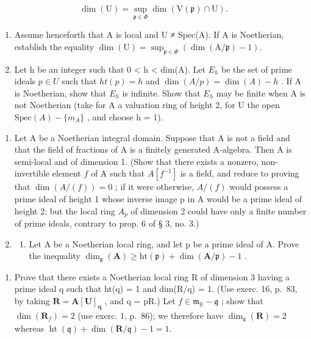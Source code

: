 \[
\dim (\mathrm{U}) = \sup _ {\mathfrak {p} \in \Phi} \dim (\mathrm{V} (\mathfrak {p}) \cap \mathrm{U}).
\]

\begin{enumerate}
\def\labelenumi{\alph{enumi})}
\setcounter{enumi}{3}
\item
  Assume henceforth that A is local and U ≠ Spec(A). If A is Noetherian, establish the equality \(\dim(\mathrm{U}) = \sup_{\mathfrak{p}\in\Phi}(\dim(\mathrm{A}/\mathfrak{p}) - 1)\).
\item
  Let h be an integer such that 0 \textless{} h \textless{} dim(A). Let \(E_{h}\) be the set of prime ideals \(p \in U\) such that \(ht(p) = h\) and \(\dim(A/p) = \dim(A) - h\) . If A is Noetherian, show that \(E_{h}\) is infinite. Show that \(E_{h}\) may be finite when A is not Noetherian (take for A a valuation ring of height 2, for U the open \(\text{Spec}(A) - \{m_{A}\}\) , and choose h = 1).
\end{enumerate}

\begin{enumerate}
\def\labelenumi{\arabic{enumi})}
\setcounter{enumi}{1}
\item
  Let A be a Noetherian integral domain. Suppose that A is not a field and that the field of fractions of A is a finitely generated A-algebra. Then A is semi-local and of dimension 1. (Show that there exists a nonzero, non-invertible element \(f\) of A such that \(A[f^{-1}]\) is a field, and reduce to proving that \(\dim(A/(f)) = 0\) ; if it were otherwise, \(A/(f)\) would possess a prime ideal of height 1 whose inverse image p in A would be a prime ideal of height 2; but the local ring \(A_p\) of dimension 2 could have only a finite number of prime ideals, contrary to prop. 6 of § 3, no. 3.)
\item
  \begin{enumerate}
  \def\labelenumii{\alph{enumii})}
  \tightlist
  \item
    Let A be a Noetherian local ring, and let p be a prime ideal of A. Prove the inequality \(\dim_{\mathfrak{p}}(\mathbf{A}) \geqslant \mathrm{ht}(\mathfrak{p}) + \dim(\mathbf{A}/\mathfrak{p}) - 1\) .
  \end{enumerate}
\end{enumerate}

\begin{enumerate}
\def\labelenumi{\alph{enumi})}
\setcounter{enumi}{1}
\tightlist
\item
  Prove that there exists a Noetherian local ring R of dimension 3 having a prime ideal q such that ht(q) = 1 and dim(R/q) = 1. (Use exerc. 16, p.~83, by taking \(\mathbf{R} = \mathbf{A}[\mathbf{U}]_{\mathbf{q}}\) , and q = pR.) Let \(f \in \mathfrak{m}_{\mathbb{R}} - \mathfrak{q}\) ; show that \(\dim(\mathbf{R}_{f}) = 2\) (use exerc. 1, p.~86); we therefore have \(\dim_{\mathfrak{q}}(\mathbf{R}) = 2\) whereas \(\operatorname{ht}(\mathfrak{q}) + \dim(\mathbf{R}/\mathfrak{q}) - 1 = 1.\)
\end{enumerate}

